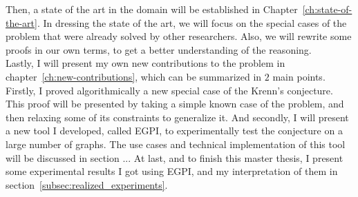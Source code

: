 Then, a state of the art in the domain will be established in Chapter~\ref{ch:state-of-the-art}.
In dressing the state of the art, we will focus on the special cases of the problem that were already solved by other researchers.
Also, we will rewrite some proofs in our own terms, to get a better understanding of the reasoning.\\

Lastly, I will present my own new contributions to the problem in chapter~\ref{ch:new-contributions}, which can be summarized in $2$ main points.
Firstly, I proved algorithmically a new special case of the Krenn's conjecture.
This proof will be presented by taking a simple known case of the problem, and then relaxing some of its constraints to generalize it.
And secondly, I will present a new tool I developed, called EGPI, to experimentally test the conjecture on a large number of graphs.
The use cases and technical implementation of this tool will be discussed in section ... %
At last, and to finish this master thesis, I present some experimental results I got using EGPI, and my interpretation of them in section~\ref{subsec:realized_experiments}.\\






